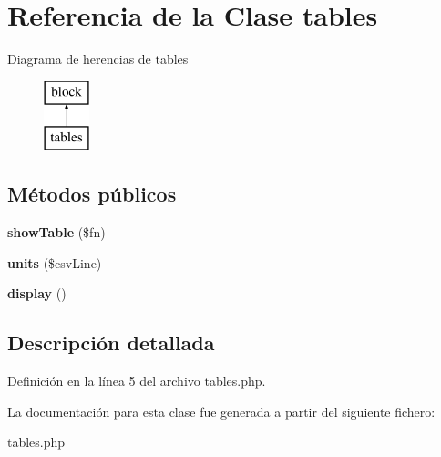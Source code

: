 \hypertarget{classtables}{\section{\-Referencia de la \-Clase tables}
\label{classtables}
}
\-Diagrama de herencias de tables\begin{figure}[H]
\begin{center}
\leavevmode
\includegraphics[height=2.000000cm]{classtables}
\end{center}
\end{figure}
\subsection*{\-Métodos públicos}
\begin{DoxyCompactItemize}
\item 
\hypertarget{classtables_abcd4e7cd574507fbd1fec1877a9cd72c}{{\bfseries show\-Table} (\$fn)}\label{classtables_abcd4e7cd574507fbd1fec1877a9cd72c}

\item 
\hypertarget{classtables_a7c9452dea1c737d4024d7560382f5f94}{{\bfseries units} (\$csv\-Line)}\label{classtables_a7c9452dea1c737d4024d7560382f5f94}

\item 
\hypertarget{classtables_a464fe5c5777973672ef774bdc1e95a43}{{\bfseries display} ()}\label{classtables_a464fe5c5777973672ef774bdc1e95a43}

\end{DoxyCompactItemize}


\subsection{\-Descripción detallada}


\-Definición en la línea 5 del archivo tables.\-php.



\-La documentación para esta clase fue generada a partir del siguiente fichero\-:\begin{DoxyCompactItemize}
\item 
tables.\-php\end{DoxyCompactItemize}
